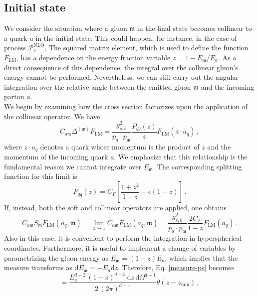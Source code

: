 \documentclass[a4paper, 12pt]{book}
\newcommand{\um}{\mathfrak{m}}
\begin{document}
\subsection{Initial state}
\label{initial-state-section}
We consider the situation where a gluon $\um$ in the final state becomes collinear to a quark $a$ in the initial state. This could happen, for instance, in the case of process $\mathcal{P}_1^{\mathrm{NLO}}$. The squared matrix element, which is used to define the function $F_{\mathrm{LM}}$, has a dependence on the energy fraction variable $z=1-E_\um/E_a$. As a direct consequence of this dependence, the integral over the collinear gluon's energy cannot be performed. Nevertheless, we can still carry out the angular integration over the relative angle between the emitted gluon $\um$ and the incoming parton $a$. \\
We begin by examining how the cross section factorizes upon the application of the collinear operator. We have
\begin{equation}
  C_{a\um} \Delta^{(\um)} F_{\mathrm{LM}} = \frac{g^2_{s,b}}{p_a \cdot p_\um} \frac{P_{qq}(z)}{z} F_{\mathrm{LM}}(z\cdot a_q) \, ,
\end{equation}
where $z \cdot a_q$ denotes a quark whose momentum is the product of $z$ and the momentum of the incoming quark $a$. We emphasize that this relationship is the fundamental reason we cannot integrate over $E_\um$. The corresponding splitting function for this limit is
\begin{equation}
  P_{qq}(z) = C_F \left[\frac{1+z^2}{1-z}-\epsilon(1-z)\right]\, .
\end{equation}
If, instead, both the soft and collinear operators are applied, one obtains
\begin{equation}
  C_{a\um} S_{\um} F_{\mathrm{LM}} (a_q, \um) = \lim_{z \to 1}  C_{a\um} F_{\mathrm{LM}} (a_q, \um)= \frac{g^2_{s,b}}{p_a \cdot p_\um} \frac{2 C_F}{1-z} F_{\mathrm{LM}}( a_q) \, .
\end{equation}
Also in this case, it is convenient to perform the integration in hyperspherical coordinates. Furthermore, it is useful to implement a change of variables by parametrizing the gluon energy as $E_\um = (1-z)E_a$, which implies that the measure transforms as $\mathrm{d}E_\um=-E_a \mathrm{d}z$. Therefore, Eq. \ref{measure-ps} becomes
\begin{equation}
  [\mathrm{d}p_\um] = \frac{E_a^{d-2}\, (1-z)^{d-3} \, \mathrm{d}z \, \mathrm{d}\Omega ^{d-1}}{2 \, (2\pi)^{d-1}} \theta(z-z_{\mathrm{min}}) \, ,
\end{equation}
\end{document}
